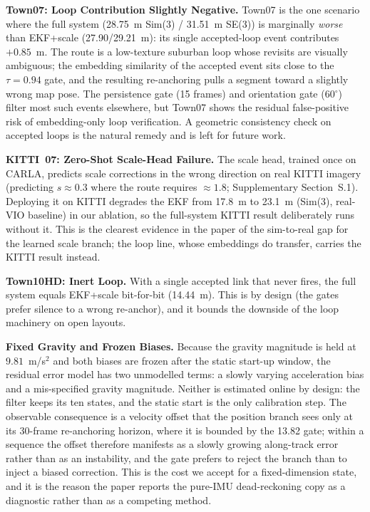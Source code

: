 \textbf{Town07: Loop Contribution Slightly Negative.} Town07 is the one scenario where the full system (28.75~m Sim(3) / 31.51~m SE(3)) is marginally \emph{worse} than EKF+scale (27.90/29.21~m): its single accepted-loop event contributes $+0.85$~m. The route is a low-texture suburban loop whose revisits are visually ambiguous; the embedding similarity of the accepted event sits close to the $\tau=0.94$ gate, and the resulting re-anchoring pulls a segment toward a slightly wrong map pose. The persistence gate (15 frames) and orientation gate (60$^\circ$) filter most such events elsewhere, but Town07 shows the residual false-positive risk of embedding-only loop verification. A geometric consistency check on accepted loops is the natural remedy and is left for future work.

\textbf{KITTI~07: Zero-Shot Scale-Head Failure.} The scale head, trained once on CARLA, predicts scale corrections in the wrong direction on real KITTI imagery (predicting $s\approx0.3$ where the route requires $\approx1.8$; Supplementary Section~S.1). Deploying it on KITTI degrades the EKF from 17.8~m to 23.1~m (Sim(3), real-VIO baseline) in our ablation, so the full-system KITTI result deliberately runs without it. This is the clearest evidence in the paper of the sim-to-real gap for the learned scale branch; the loop line, whose embeddings do transfer, carries the KITTI result instead.

\textbf{Town10HD: Inert Loop.} With a single accepted link that never fires, the full system equals EKF+scale bit-for-bit (14.44~m). This is by design (the gates prefer silence to a wrong re-anchor), and it bounds the downside of the loop machinery on open layouts.

\textbf{Fixed Gravity and Frozen Biases.} Because the gravity magnitude is held at $9.81$~m/s$^2$ and both biases are frozen after the static start-up window, the residual error model has two unmodelled terms: a slowly varying acceleration bias and a mis-specified gravity magnitude. Neither is estimated online by design: the filter keeps its ten states, and the static start is the only calibration step. The observable consequence is a velocity offset that the position branch sees only at its 30-frame re-anchoring horizon, where it is bounded by the 13.82 gate; within a sequence the offset therefore manifests as a slowly growing along-track error rather than as an instability, and the gate prefers to reject the branch than to inject a biased correction. This is the cost we accept for a fixed-dimension state, and it is the reason the paper reports the pure-IMU dead-reckoning copy as a diagnostic rather than as a competing method.


